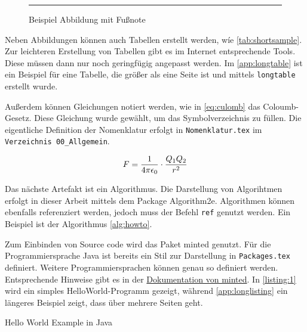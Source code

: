 \begin{figure}[h]
\centering
\rule{.5\textwidth}{1cm}
\caption[{Beispiel Abbildung}]{Beispiel Abbildung mit Fußnote\protect\footnotemark}
\label{fig:example}
\end{figure}

Neben Abbildungen können auch Tabellen erstellt werden, wíe \cref{tab:shortsample}. 
Zur leichteren Erstellung von Tabellen gibt es im Internet entsprechende Tools. 
Diese müssen dann nur noch geringfügig angepasst werden. 
Im \cref{app:longtable} ist ein Beispiel für eine Tabelle, die größer als eine Seite ist und mittels \texttt{longtable} erstellt wurde.



Außerdem können Gleichungen notiert werden, wie in \cref{eq:culomb} das Coloumb-Gesetz.
Diese Gleichung wurde gewählt, um das Symbolverzeichnis zu füllen. 
Die eigentliche Definition der Nomenklatur erfolgt in \texttt{Nomenklatur.tex} im \texttt{Verzeichnis 00\_Allgemein}.

\begin{equation}
    \label{eq:culomb}
    \equationentry{Coulomb-Gesetz}
    F = \frac{1}{4\pi\epsilon_0}\cdot\frac{Q_1Q_2}{r^2}
\end{equation}

Das nächste Artefakt ist ein Algorithmus.
Die Darstellung von Algorihtmen erfolgt in dieser Arbeit mittels dem Package Algorithm2e.
Algorithmen können ebenfalls referenziert werden, jedoch muss der Befehl \texttt{ref} genutzt werden.
Ein Beispiel ist der Algorithmus \ref{alg:howto}.



Zum Einbinden von Source code wird das Paket minted genutzt. 
Für die Programmiersprache Java ist bereits ein Stil zur Darstellung in \texttt{Packages.tex} definiert.
Weitere Programmiersprachen können genau so definiert werden. Entsprechende Hinweise gibt es in der 
\href{https://www.ctan.org/pkg/minted}{Dokumentation von minted}.
In \cref{listing:1} wird ein simples HelloWorld-Programm gezeigt, während \cref{app:longlisting} ein längeres Beispiel zeigt, dass über mehrere Seiten geht.

\begin{listing}[h]
\caption{Hello World Example in Java}
\label{listing:1}
\inputminted{java}{04_Artefakte/03_Listings/HelloWorld.java}
\end{listing}

\blinddocument


